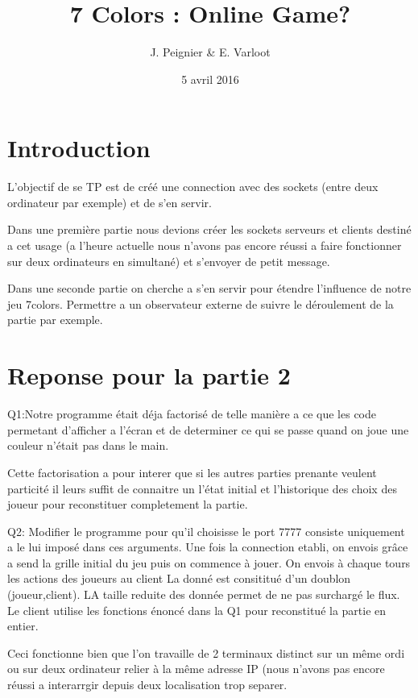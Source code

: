 \documentclass[a4paper]{article}
\title{7 Colors : Online Game?}
\author{J. Peignier \& E. Varloot}
\date{5 avril 2016}
\begin{document}
\maketitle{}

\pagebreak{}
	
\section{Introduction}
L'objectif de se TP est de créé une connection avec des sockets (entre deux ordinateur par exemple) et de s'en servir. 

Dans une première partie nous devions créer les sockets serveurs et clients destiné a cet usage (a l'heure actuelle nous n'avons pas encore réussi a faire fonctionner sur deux ordinateurs en simultané) et  s'envoyer de petit message.

Dans une seconde partie on cherche a s'en servir pour étendre l'influence de notre jeu 7colors. Permettre a un observateur externe de suivre le déroulement de la partie par exemple.

\section{Reponse pour la partie 2}
 
Q1:Notre programme était déja factorisé de telle manière a ce que les code permetant d'afficher a l'écran et de determiner ce qui se passe quand on joue une couleur n'était pas dans le main. 
 
Cette factorisation a pour interer que si les autres parties prenante veulent particité il leurs suffit de connaitre un l'état initial et l'historique des choix des joueur pour reconstituer completement la partie.
\bigskip

Q2: Modifier le programme pour qu'il choisisse le port 7777 consiste uniquement a le lui imposé dans ces arguments.
Une fois la connection etabli, on envois grâce a send la grille initial du jeu puis on commence à jouer. On envois à chaque tours les actions des joueurs au client La donné est consititué d'un doublon (joueur,client).
LA taille reduite des donnée permet de ne pas surchargé le flux.
Le client utilise les fonctions énoncé dans la Q1 pour reconstitué la partie en entier.

Ceci fonctionne bien que l'on travaille de 2 terminaux distinct sur un même ordi ou sur deux ordinateur relier à la même adresse IP (nous n'avons pas encore réussi a interarrgir depuis deux localisation trop separer.
\end{document}
